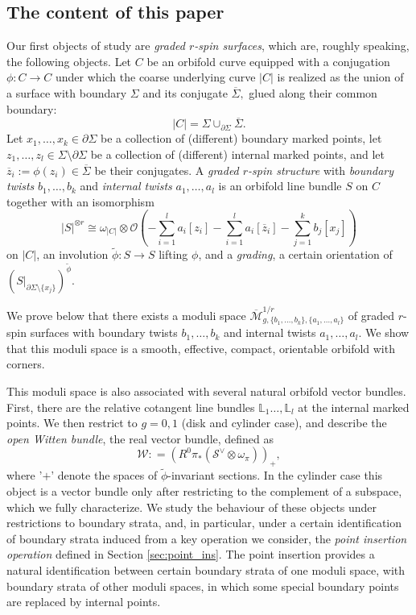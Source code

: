 \documentclass[11pt,a4paper]{article}
\theoremstyle{definition}
\theoremstyle{remark}
\numberwithin{equation}{section}
\def\Mbar{{\overline{\mathcal M}}}
\begin{document}
\subsection{The content of this paper}

Our first objects of study are \emph{graded $r$-spin surfaces}, which are, roughly speaking, the following objects. Let $C$ be an orbifold curve equipped with a conjugation $\phi: C \to C$ under which the coarse underlying curve $|C|$ is realized as the union of a surface with boundary $\Sigma$ and its conjugate $\overline{\Sigma},$ glued along their common boundary:
\[|C| = \Sigma \cup_{{\partial}\Sigma} \overline{\Sigma}.\]
Let $x_1, \ldots, x_k \in {\partial}\Sigma$ be a collection of (different) boundary marked points, let $z_1, \ldots, z_l \in \Sigma \setminus {\partial}\Sigma$ be a collection of (different) internal marked points, and let $\overline{z}_i:= \phi(z_i) \in \overline{\Sigma}$ be their conjugates.  A \emph{graded $r$-spin structure} with \emph{boundary twists} $b_1,\ldots,b_k$ and \emph{internal twists} $a_1, \ldots, a_l$ is an orbifold line bundle $S$ on $C$ together with an isomorphism
\[|S|^{\otimes r} \cong \omega_{|C|} \otimes {\mathcal{O}}\left(-\sum_{i=1}^l a_i[z_i] - \sum_{i=1}^l a_i[\overline{z}_i] - \sum_{j=1}^k b_j[x_j]\right)\]
on $|C|$, an involution $\widetilde{\phi}: S \to S$ lifting $\phi$, and a \emph{grading}, a certain orientation of $\left(S|_{{\partial}\Sigma \setminus \{x_j\}}\right)^{\widetilde\phi}$. 

We prove below that there exists a moduli space $\Mbar_{g,\{b_1,\ldots,b_k\},\{a_1, \ldots, a_l\}}^{1/r}$ of graded $r$-spin surfaces with boundary twists $b_1,\ldots,b_k$ and internal twists $a_1, \ldots, a_l$. We show that this moduli space is a smooth, effective, compact, orientable orbifold with corners.

This moduli space is also associated with several natural orbifold vector bundles.
First, there are the relative cotangent line bundles $\mathbb{L}_1 \ldots, \mathbb{L}_l$ at the internal marked points. We then restrict to $g=0,1$ (disk and cylinder case), and describe the \emph{open Witten bundle}, the real vector bundle, defined as
\[
\mathcal{W}: = (R^0\pi_*(\mathcal{S}^{\vee} \otimes \omega_{\pi}))_+,
\]
where '$+$'  denote the spaces of $\widetilde{\phi}$-invariant sections. {In the cylinder case this object is a vector bundle only after restricting to the complement of a subspace, which we fully characterize.}
We study the behaviour of these objects under restrictions to boundary strata, and, in particular, under a certain identification of boundary strata induced from a key operation we consider, the \emph{point insertion operation} defined in Section \ref{sec:point_ins}.
The point insertion provides a natural identification between certain boundary strata of one moduli space, with boundary strata of other moduli spaces, in which some special boundary points are replaced by internal points. 
\end{document}
